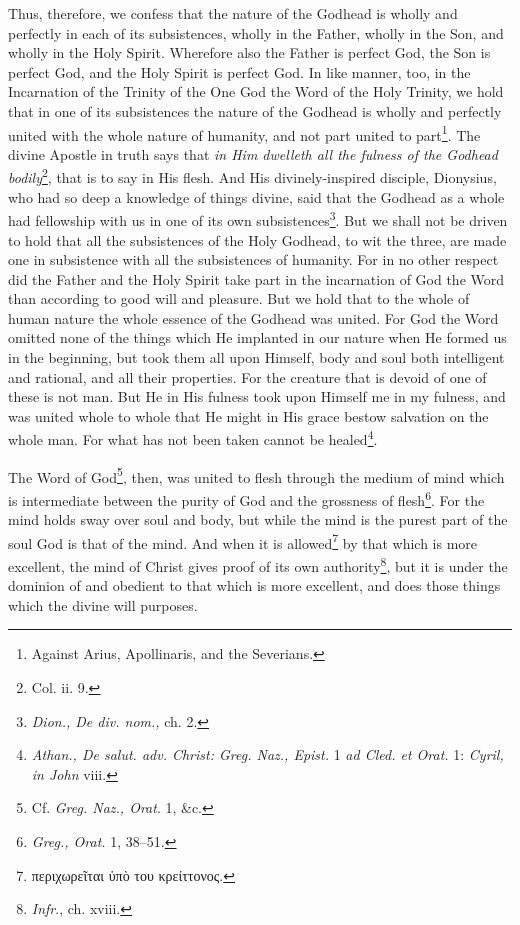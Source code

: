 Thus, therefore, we confess that the nature of the Godhead is wholly and perfectly in each of its subsistences, wholly in the Father, wholly in the Son, and wholly in the Holy Spirit. Wherefore also the Father is perfect God, the Son is perfect God, and the Holy Spirit is perfect God. In like manner, too, in the Incarnation of the Trinity of the One God the Word of the Holy Trinity, we hold that in one of its subsistences the nature of the Godhead is wholly and perfectly united with the whole nature of humanity, and not part united to part\footnote{Against Arius, Apollinaris, and the Severians.}. The divine Apostle in truth says that \emph{in Him dwelleth all the fulness of the Godhead bodily}\footnote{Col. ii. 9.}, that is to say in His flesh. And His divinely-inspired disciple, Dionysius, who had so deep a knowledge of things divine, said that the Godhead as a whole had fellowship with us in one of its own subsistences\footnote{\emph{Dion., De div. nom., }ch. 2.}. But we shall not be driven to hold that all the subsistences of the Holy Godhead, to wit the three, are made one in subsistence with all the subsistences of humanity. For in no other respect did the Father and the Holy Spirit take part in the incarnation of God the Word than according to good will and pleasure. But we hold that to the whole of human nature the whole essence of the Godhead was united. For God the Word omitted none of the things which He implanted in our nature when He formed us in the beginning, but took them all upon Himself, body and soul both intelligent and rational, and all their properties. For the creature that is devoid of one of these is not man. But He in His fulness took upon Himself me in my fulness, and was united whole to whole that He might in His grace bestow salvation on the whole man. For what has not been taken cannot be healed\footnote{\emph{Athan., De salut. adv. Christ: Greg. Naz., Epist. }1 \emph{ad Cled. et Orat. }1: \emph{Cyril, in John }viii.}.

The Word of God\footnote{Cf. \emph{Greg. Naz., Orat}. 1, \&c.}, then, was united to flesh through the medium of mind which is intermediate between the purity of God and the grossness of flesh\footnote{\emph{Greg., Orat.} 1, 38–51.}. For the mind holds sway over soul and body, but while the mind is the purest part of the soul God is that of the mind. And when it is allowed\footnote{\textgreek{περιχωρεῖται ὑπὸ του κρείττονος}.} by that which is more excellent, the mind of Christ gives proof of its own authority\footnote{\emph{Infr}., ch. xviii.}, but it is under the dominion of and obedient to that which is more excellent, and does those things which the divine will purposes.

